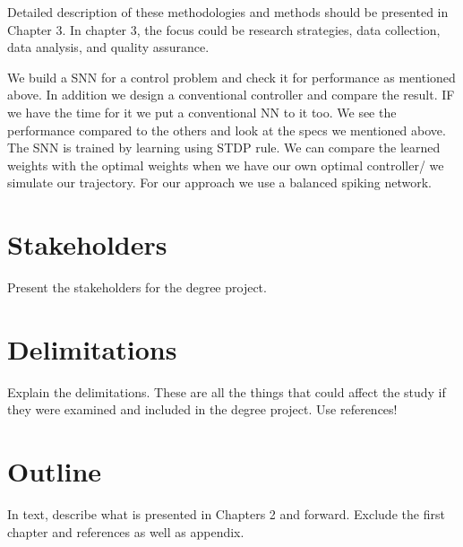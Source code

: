 Detailed description of these methodologies and methods should be presented in Chapter 3. In chapter 3, the focus could be research strategies, data collection, data analysis, and quality assurance.


We build a SNN for a control problem and check it for performance as mentioned above. In addition we design a conventional controller and compare the result. IF we have the time for it we put a conventional NN to it too. We see the performance compared to the others and look at the specs we mentioned above.
The SNN is trained by learning using STDP rule. We can compare the learned weights with the optimal weights when we have our own optimal controller/ we simulate our trajectory.
For our approach we use a balanced spiking network.
\section{Stakeholders}
Present the stakeholders for the degree project.

\section{Delimitations}
Explain the delimitations. These are all the things that could affect the study if they were examined and included in the degree project.
Use references!

\section{Outline}
In text, describe what is presented in Chapters 2 and forward. Exclude the first chapter and references as well as appendix.
